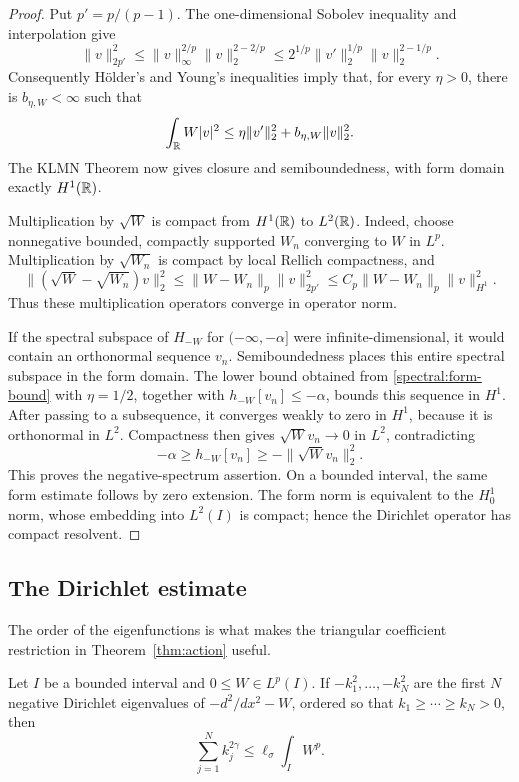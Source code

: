 \begin{proof}
Put $p'=p/(p-1)$.  The one-dimensional Sobolev inequality and
interpolation give
\[
 \|v\|_{2p'}^2
 \leq \|v\|_\infty^{2/p}\|v\|_2^{2-2/p}
 \leq 2^{1/p}\|v'\|_2^{1/p}\|v\|_2^{2-1/p}.
\]
Consequently H\"older's and Young's inequalities imply that, for every
$\eta>0$, there is $b_{\eta,W}<\infty$ such that
\begin{equation}\label{spectral:form-bound}
 \int_\mathbb R W|v|^2
 \leq \eta\|v'\|_2^2+b_{\eta,W}\|v\|_2^2.
\end{equation}
The KLMN Theorem \cite[Theorem~6.24]{Teschl2009} now gives closure and semiboundedness, with
form domain exactly $H^1(\mathbb R)$.

Multiplication by $\sqrt W$ is compact from $H^1(\mathbb R)$ to $L^2(\mathbb R)$.
Indeed, choose nonnegative bounded, compactly supported $W_n$ converging
to $W$ in $L^p$.  Multiplication by $\sqrt{W_n}$ is compact by local
Rellich compactness, and
\[
 \| (\sqrt W-\sqrt{W_n})v\|_2^2
 \leq \|W-W_n\|_p\|v\|_{2p'}^2
 \leq C_p\|W-W_n\|_p\|v\|_{H^1}^2.
\]
Thus these multiplication operators converge in operator norm.

If the spectral subspace of $H_{-W}$ for $(-\infty,-\alpha]$ were
infinite-dimensional, it would contain an orthonormal sequence $v_n$.
Semiboundedness places this entire spectral subspace in the form domain.
The lower bound obtained from \eqref{spectral:form-bound} with
$\eta=1/2$, together with $h_{-W}[v_n]\leq-\alpha$, bounds this
sequence in $H^1$.  After passing to a subsequence, it converges weakly
to zero in $H^1$, because it is orthonormal in $L^2$.  Compactness then
gives $\sqrt Wv_n\to0$ in $L^2$, contradicting
\[
 -\alpha\geq h_{-W}[v_n]\geq-\|\sqrt Wv_n\|_2^2.
\]
This proves the negative-spectrum assertion.  On a bounded interval,
the same form estimate follows by zero extension.  The form norm is
equivalent to the $H^1_0$ norm, whose embedding into $L^2(I)$ is compact;
hence the Dirichlet operator has compact resolvent.
\end{proof}

\subsection{The Dirichlet estimate}

The order of the eigenfunctions is what makes the triangular
coefficient restriction in Theorem~\ref{thm:action} useful.

\begin{proposition}\label{spectral:dirichlet}
Let $I$ be a bounded interval and $0\leq W\in L^p(I)$.  If
$-k_1^2,\ldots,-k_N^2$ are the first $N$ negative Dirichlet eigenvalues
of $-d^2/dx^2-W$, ordered so that $k_1\geq\cdots\geq k_N>0$, then
\begin{equation}\label{spectral:dirichlet-bound}
 \sum_{j=1}^N k_j^{2\gamma}
 \leq \ell_\sigma\int_I W^p.
\end{equation}
\end{proposition}

